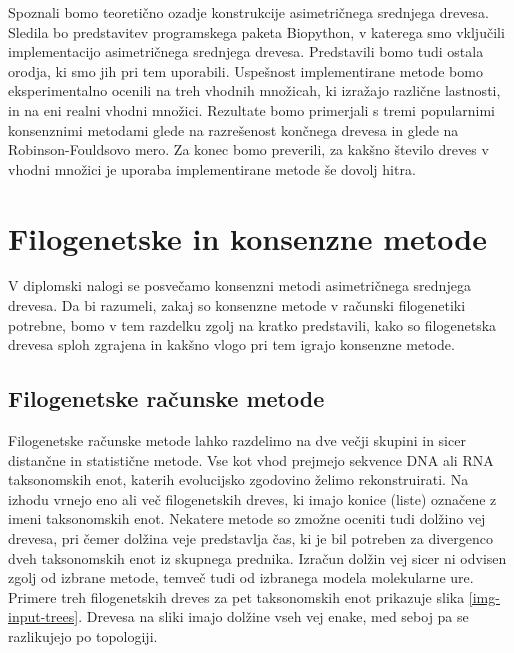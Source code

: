 \documentclass[a4paper, 12pt]{book}
\begin{document}
Spoznali bomo teoretično ozadje konstrukcije asimetričnega srednjega drevesa.
Sledila bo predstavitev programskega paketa Biopython, v katerega smo
vključili implementacijo asimetričnega srednjega drevesa. Predstavili bomo tudi ostala orodja, ki smo
jih pri tem uporabili. Uspešnost implementirane metode bomo eksperimentalno ocenili
na treh vhodnih množicah, ki izražajo različne lastnosti, in na eni realni vhodni 
množici. Rezultate bomo primerjali s tremi popularnimi konsenznimi metodami glede
na razrešenost končnega drevesa in glede na Robinson-Fouldsovo mero. 
Za  konec bomo preverili, za kakšno število dreves v vhodni množici je uporaba
implementirane metode še dovolj hitra.


\chapter{Filogenetske in konsenzne metode}

V diplomski nalogi se posvečamo konsenzni metodi asimetričnega srednjega drevesa. Da bi 
razumeli, zakaj so konsenzne metode v računski filogenetiki potrebne, bomo v tem 
razdelku zgolj na kratko predstavili, kako so filogenetska drevesa sploh zgrajena in 
kakšno vlogo pri tem igrajo konsenzne metode. 

\section{Filogenetske računske metode}

Filogenetske računske metode lahko razdelimo na dve večji skupini in sicer distančne in
statistične metode. Vse kot vhod prejmejo sekvence DNA ali RNA taksonomskih enot, 
katerih evolucijsko zgodovino želimo rekonstruirati. Na izhodu vrnejo eno ali
več filogenetskih dreves, ki imajo konice (liste) označene z imeni taksonomskih enot.
Nekatere metode so zmožne oceniti tudi dolžino vej drevesa, pri čemer dolžina veje
predstavlja čas, ki je bil potreben za divergenco dveh taksonomskih enot iz skupnega
prednika. Izračun dolžin vej sicer ni odvisen zgolj od izbrane metode, temveč tudi 
od izbranega modela molekularne ure. Primere treh filogenetskih dreves za pet 
taksonomskih enot prikazuje slika \ref{img-input-trees}. Drevesa na sliki imajo 
dolžine vseh vej enake, med seboj pa se razlikujejo po topologiji.
\end{document}
